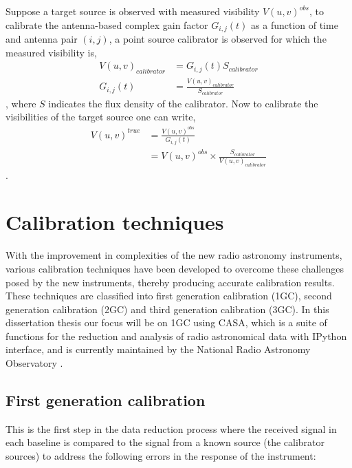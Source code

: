 Suppose a target source is observed with measured visibility $V(u,v)^{obs}$, to calibrate the antenna-based complex gain factor $G_{i,j}(t)$ as a function of time and antenna pair $(i,j)$, a point source calibrator is observed for which the measured visibility is, 
\begin{align}
V(u,v)_{calibrator}&= G_{i,j}(t) S_{calibrator}\\
G_{i,j}(t)&= \frac{V(u,v)_{calibrator}}{S_{calibrator}}
\end{align}
\citep{thompson2001interferometry},
where $S$ indicates the flux density of the calibrator. Now to calibrate the visibilities of the target source one can write, 
\begin{align}
V(u,v)^{true}&= \frac{V(u,v)^{obs}}{G_{i,j}(t)}\\
&= V(u,v)^{obs} \times \frac{S_{calibrator}}{V(u,v)_{calibrator}} 
\end{align}
\citep{thompson2001interferometry}. 

\section{Calibration techniques}
\label{caltech}
With the improvement in complexities of the new radio astronomy instruments, various calibration techniques have been developed to overcome these challenges  posed by the new instruments, thereby producing accurate calibration results. These techniques are classified into first generation calibration (1GC), second generation calibration (2GC) and third generation calibration (3GC). In this dissertation thesis our focus will be on 1GC using CASA, which is a suite of functions for the reduction and analysis of radio astronomical data with IPython interface, and is currently maintained by the National Radio Astronomy Observatory \citep{mcmullin2007casa}. 

\subsection{First generation calibration}

This is the first step in the data reduction process where the received signal in each baseline is compared to the signal from a known source (the calibrator sources) to address the following errors in the response of the instrument: 

